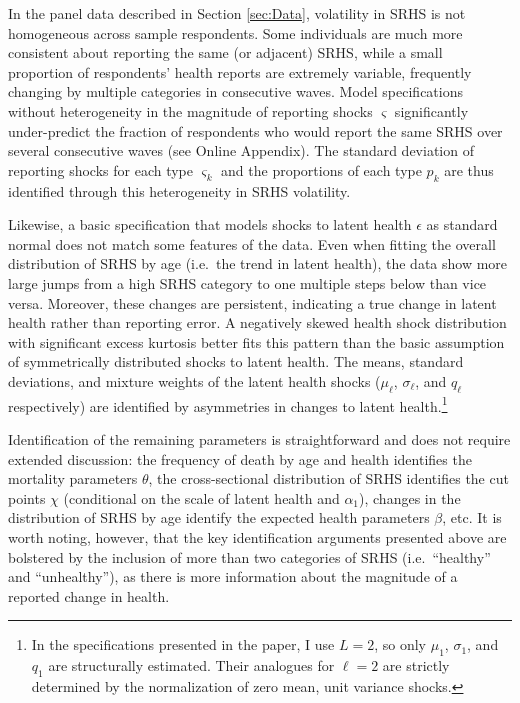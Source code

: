 \documentclass[12pt,pdftex,letterpaper]{article}
\newcommand{\Cut}{\chi}
\newcommand{\MortParam}{\theta}
\newcommand{\HealthParam}{\beta}
\newcommand{\LatentParam}{\alpha}
\newcommand{\HealthShock}{\epsilon}
\newcommand{\ShockMean}{\mu}
\newcommand{\ShockStd}{\sigma}
\newcommand{\MixProb}{q}
\newcommand{\TypeProb}{p}
\newcommand{\ReportStd}{\varsigma}
\begin{document}
In the panel data described in Section \ref{sec:Data}, volatility in SRHS is not homogeneous across sample respondents. Some individuals are much more consistent about reporting the same (or adjacent) SRHS, while a small proportion of respondents' health reports are extremely variable, frequently changing by multiple categories in consecutive waves. Model specifications without heterogeneity in the magnitude of reporting shocks $\ReportStd$ significantly under-predict the fraction of respondents who would report the same SRHS over several consecutive waves (see Online Appendix). The standard deviation of reporting shocks for each type $\ReportStd_k$ and the proportions of each type $\TypeProb_k$ are thus identified through this heterogeneity in SRHS volatility.

Likewise, a basic specification that models shocks to latent health $\HealthShock$ as standard normal does not match some features of the data. Even when fitting the overall distribution of SRHS by age (i.e.\ the trend in latent health), the data show more large jumps from a high SRHS category to one multiple steps below than vice versa. Moreover, these changes are persistent, indicating a true change in latent health rather than reporting error. A negatively skewed health shock distribution with significant excess kurtosis better fits this pattern than the basic assumption of symmetrically distributed shocks to latent health. The means, standard deviations, and mixture weights of the latent health shocks ($\ShockMean_\ell$, $\ShockStd_\ell$, and $\MixProb_\ell$ respectively) are identified by asymmetries in changes to latent health.\footnote{In the specifications presented in the paper, I use $L=2$, so only $\ShockMean_1$, $\ShockStd_1$, and $\MixProb_1$ are structurally estimated. Their analogues for $\ell=2$ are strictly determined by the normalization of zero mean, unit variance shocks.} 

Identification of the remaining parameters is straightforward and does not require extended discussion: the frequency of death by age and health identifies the mortality parameters $\MortParam$, the cross-sectional distribution of SRHS identifies the cut points $\Cut$ (conditional on the scale of latent health and $\LatentParam_1$), changes in the distribution of SRHS by age identify the expected health parameters $\HealthParam$, etc.  It is worth noting, however, that the key identification arguments presented above are bolstered by the inclusion of more than two categories of SRHS (i.e.\ ``healthy'' and ``unhealthy''), as there is more information about the magnitude of a reported change in health.
\end{document}
